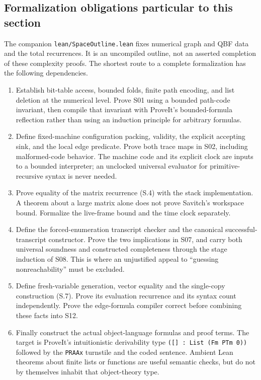 \subsection{Formalization obligations particular to this section}

The companion \texttt{lean/SpaceOutline.lean} fixes numerical graph
and QBF data and the total recurrences.  It is an uncompiled outline,
not an asserted completion of these complexity proofs.  The shortest
route to a complete formalization has the following dependencies.

\begin{enumerate}
\item Establish bit-table access, bounded folds, finite path encoding,
      and list deletion at the numerical level.  Prove S01 using a
      bounded path-code invariant, then compile that invariant with
      ProveIt's bounded-formula reflection rather than using an
      induction principle for arbitrary formulas.
\item Define fixed-machine configuration packing, validity, the explicit
      accepting sink, and the local edge predicate.  Prove both trace
      maps in S02, including malformed-code behavior.  The machine code
      and its explicit clock are inputs to a bounded interpreter; an
      unclocked universal evaluator for primitive-recursive syntax is
      never needed.
\item Prove equality of the matrix recurrence (S.4) with the stack
      implementation.  A theorem about a large matrix alone does not
      prove Savitch's workspace bound.  Formalize the live-frame bound
      and the time clock separately.
\item Define the forced-enumeration transcript checker and the canonical
      successful-transcript constructor.  Prove the two implications in
      S07, and carry both universal soundness and constructed completeness
      through the stage induction of S08.  This is where an unjustified
      appeal to ``guessing nonreachability'' must be excluded.
\item Define fresh-variable generation, vector equality and the single-copy
      construction (S.7).  Prove its evaluation recurrence and its syntax
      count independently.  Prove the edge-formula compiler correct before
      combining these facts into S12.
\item Finally construct the actual object-language formulas and proof
      terms.  The target is ProveIt's intuitionistic derivability type
      \texttt{([] : List (Fm PTm 0))} followed by the
      \texttt{PRAAx} turnstile and the coded sentence.  Ambient Lean
      theorems about finite lists or functions are useful semantic
      checks, but do not by themselves inhabit that object-theory type.
\end{enumerate}
